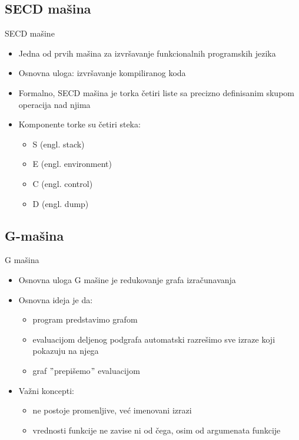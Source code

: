 \documentclass[xcolor={dvipsnames}, 11pt]{beamer}
\begin{document}
\subsection{SECD mašina}

\begin{frame}{SECD mašine}
	\begin{itemize}
	\item Jedna od prvih mašina za izvršavanje funkcionalnih programskih jezika
	\item Osnovna uloga: izvršavanje kompiliranog koda
	\item Formalno, SECD mašina je torka četiri liste sa precizno definisanim skupom operacija nad njima
	\item Komponente torke su četiri steka: 
		\begin{itemize}
		\item S (engl. stack)
		\item E (engl. environment)
		\item C (engl. control)
		\item D	(engl. dump)
		\end{itemize}
	\end{itemize}
	
\end{frame}

\subsection{G-mašina}
\begin{frame}{G mašina}
	\begin{itemize}
		\item Osnovna uloga G mašine je redukovanje grafa izračunavanja
		\item Osnovna ideja je da: 
			\begin{itemize}
			\item program predstavimo grafom
			\item evaluacijom deljenog podgrafa automatski razrešimo sve izraze koji pokazuju na njega
			\item graf $"$prepišemo$"$ evaluacijom
			\end{itemize}
		\item Važni koncepti:
			\begin{itemize}
			\item ne postoje promenljive, već imenovani izrazi
			\item vrednosti funkcije ne zavise ni od čega, osim od argumenata funkcije
			\end{itemize}				
	\end{itemize}
\end{frame}
\end{document}
